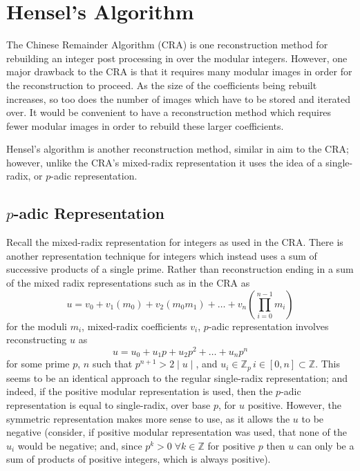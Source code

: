 \documentclass[letterpaper,12pt,titlepage,oneside,final]{book}
\begin{document}
\section{Hensel's Algorithm}

The Chinese Remainder Algorithm (CRA) is one reconstruction method for rebuilding an integer post processing in over the modular integers.  However, one major drawback to the CRA is that it requires many modular images in order for the reconstruction to proceed.  As the size of the coefficients being rebuilt increases, so too does the number of images which have to be stored and iterated over.  It would be convenient to have a reconstruction method which requires fewer modular images in order to rebuild these larger coefficients.   

Hensel's algorithm is another reconstruction method, similar in aim to the CRA; however, unlike the CRA's mixed-radix representation it uses the idea of a single-radix, or ${p}$-adic representation.

\subsection{${p}$-adic Representation}

Recall the mixed-radix representation for integers as used in the CRA.  There is another representation technique for integers which instead uses a sum of successive products of a single prime.  Rather than reconstruction ending in a sum of the mixed radix representations such as in the CRA as
\begin{equation*}
  u = v_0 + v_1(m_0) + v_2(m_0m_1) + \ldots + v_n(\prod_{i=0}^{n-1}m_i)
\end{equation*}
for the moduli ${m_i}$, mixed-radix coefficients ${v_i}$, ${p}$-adic representation involves reconstructing ${u}$ as 
\begin{equation*}
  u = u_0 + u_1p + u_2p^2 + \ldots + u_np^n
\end{equation*}
for some prime ${p}$, ${n}$ such that ${p^{n+1} > 2 \mid u \mid}$, and ${u_i \in \mathbb{Z}_p\, i \in [0, n] \subset \mathbb{Z}}$.  This seems to be an identical approach to the regular single-radix representation; and indeed, if the positive modular representation is used, then the ${p}$-adic representation is equal to single-radix, over base ${p}$, for ${u}$ positive.  However, the symmetric representation makes more sense to use, as it allows the ${u}$ to be negative (consider, if positive modular representation was used, that none of the ${u_i}$ would be negative; and, since ${p^k > 0 \; \forall k \in \mathbb{Z}}$ for positive ${p}$ then ${u}$ can only be a sum of products of positive integers, which is always positive).  
\end{document}
